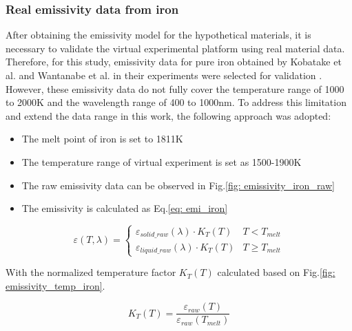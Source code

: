 \subsubsection{Real emissivity data from iron}
After obtaining the emissivity model for the hypothetical materials, it is 
necessary to validate the virtual experimental platform 
using real material data. Therefore, for this study, emissivity data for pure 
iron obtained by Kobatake et al. and Wantanabe et al. in their experiments were 
selected for validation \cite{Kobatake.2012, Watanabe.2003}. However, these 
emissivity data do not fully cover the temperature range of 1000 to 2000K and 
the wavelength range of 400 to 1000nm. To address this limitation and extend the 
data range in this work, the following approach was adopted:

\begin{itemize}
  \item The melt point of iron is set to 1811K
  \item The temperature range of virtual experiment is set as 1500-1900K
  \item The raw emissivity data can be observed in Fig.\ref{fig: emissivity_iron_raw}
  \item The emissivity is calculated as Eq.\ref{eq: emi_iron}
\end{itemize}


\begin{equation}
  \label{eq: emi_iron}
  \varepsilon(T, \lambda) = \begin{cases}
      \varepsilon_{solid{\_}raw}(\lambda) \cdot K_{T}(T)&   T<T_{melt}\\
      \varepsilon_{liquid{\_}raw}(\lambda) \cdot K_{T}(T)&  T\geq T_{melt}
  \end{cases}
\end{equation}


With the normalized temperature factor $K_{T}(T)$ calculated based 
on Fig.\ref{fig: emissivity_temp_iron}.


\begin{equation}
  \label{eq: emi_KT_iron}
  K_{T}(T) = \frac{\varepsilon_{raw}(T)}{\varepsilon_{raw}(T_{melt})} 
\end{equation}



